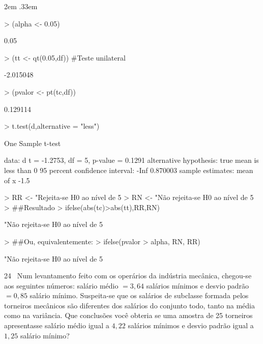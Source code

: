 \documentclass{article}
\newenvironment{ManualExercise}
  {\begin{list}{}{\leftmargin \QuestionIndent
    \partopsep0pt \parsep\parskip \topsep\QuestionBefore
    \itemsep\QuestionBefore \labelwidth2em
    \labelsep.33em
    \usecounter{Question}}}
  {\end{list}}
\begin{document}
\begin{Exercise}
\begin{ManualExercise}
\begin{Schunk}
\begin{Sinput}
> (alpha <- 0.05)
\end{Sinput}
\begin{Soutput}
[1] 0.05
\end{Soutput}
\begin{Sinput}
> (tt <- qt(0.05,df)) #Teste unilateral
\end{Sinput}
\begin{Soutput}
[1] -2.015048
\end{Soutput}
\begin{Sinput}
> (pvalor <- pt(tc,df))
\end{Sinput}
\begin{Soutput}
[1] 0.129114
\end{Soutput}
\begin{Sinput}
> t.test(d,alternative = "less")
\end{Sinput}
\begin{Soutput}
	One Sample t-test

data:  d
t = -1.2753, df = 5, p-value = 0.1291
alternative hypothesis: true mean is less than 0
95 percent confidence interval:
     -Inf 0.870003
sample estimates:
mean of x 
     -1.5 
\end{Soutput}
\begin{Sinput}
> RR <- "Rejeita-se H0 ao nível de 5%
> RN <- "Não rejeita-se H0 ao nível de 5%
> ##Resultado
> ifelse(abs(tc)>abs(tt),RR,RN)
\end{Sinput}
\begin{Soutput}
[1] "Não rejeita-se H0 ao nível de 5%
\end{Soutput}
\begin{Sinput}
> ##Ou, equivalentemente:
> ifelse(pvalor > alpha, RN, RR)
\end{Sinput}
\begin{Soutput}
[1] "Não rejeita-se H0 ao nível de 5%
\end{Soutput}
\end{Schunk}

\item[24~] Num levantamento feito com os operários da indústria mecânica, chegou-se aos seguintes números: salário médio $= 3,64$ salários mínimos e desvio padrão $= 0,85$ 
salário mínimo. Suspeita-se que os salários de subclasse formada pelos torneiros mecânicos são diferentes dos salários do conjunto todo, tanto na média como na variância. Que conclusões você obteria se uma amostra de 25 torneiros apresentasse salário médio igual a $4,22$ salários mínimos e desvio padrão igual a $1,25$ salário mínimo?


\end{ManualExercise}
\end{Exercise}
\end{document}
